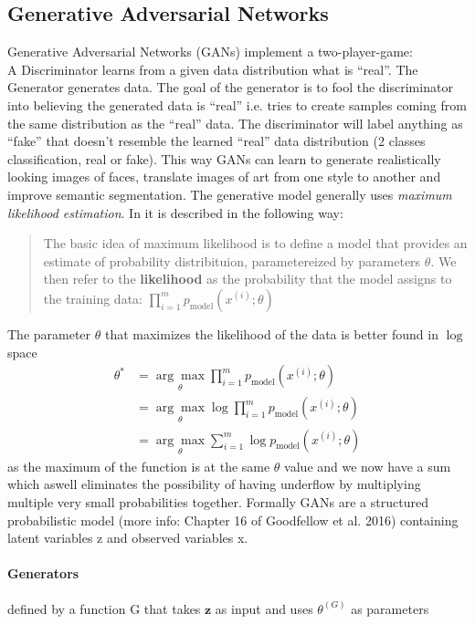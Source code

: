 \subsection{Generative Adversarial Networks}
Generative Adversarial Networks (GANs) implement a two-player-game:\\
A Discriminator learns from a given data distribution what is ``real''. The Generator generates data. The goal of the generator is to fool the discriminator into believing the generated data is ``real'' i.e. tries to create samples coming from the same distribution as the ``real'' data. The discriminator will label anything as ``fake'' that doesn't resemble the learned ``real'' data distribution (2 classes classification, real or fake). This way GANs can learn to generate realistically looking images of faces, translate images of art from one style to another and improve semantic segmentation.
The generative model generally uses \textit{maximum likelihood estimation}. In \cite{DBLP:journals/corr/Goodfellow17} it is described in the following way:
\begin{quote}
	The basic idea of maximum likelihood is to define a model that provides an estimate of probability distribituion, parametereized by parameters $\theta$. We then refer to the \textbf{likelihood} as the probability that the model assigns to the training data: $\prod_{i=1}^{m}p_{\text{model}}(x^{(i)}; \theta)$
\end{quote}
The parameter $\theta$ that maximizes the likelihood of the data is better found in $\log$ space \cite{DBLP:journals/corr/Goodfellow17}
\begin{align}
	\theta^* &= \underset{\theta}{\arg \max} \prod_{i = 1}^{m} p_{\text{model}} (x^{(i)}; \theta)\\
	&= \underset{\theta}{\arg \max} \log \prod_{i=1}^{m} p_{\text{model}}(x^{(i)}; \theta)\\
	&= \underset{\theta}{\arg \max} \sum_{i = 1}^{m} \log p_{\text{model}}(x^{(i)}; \theta)
\end{align}
as the maximum of the function is at the same $\theta$ value and we now have a sum which aswell eliminates the possibility of having underflow by multiplying multiple very small probabilities together.
Formally GANs are a structured probabilistic model (more info: Chapter 16 of Goodfellow et al. 2016) containing latent variables z and observed variables x.


\paragraph{Generators}
defined by a function G that takes $\mathbf{z}$ as input and uses $\theta^{(G)}$ as parameters

